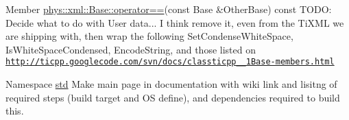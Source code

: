\label{dd/da0/todo__todo000032}
\hypertarget{dd/da0/todo__todo000032}{}
 
\begin{DoxyDescription}
\item[Member \hyperlink{classphys_1_1xml_1_1Base_af5412e64fd83a5193e28a20df462b9a6}{phys::xml::Base::operator==}(const Base \&OtherBase) const  ]TODO: Decide what to do with User data... I think remove it, even from the TiXML we are shipping with, then wrap the following SetCondenseWhiteSpace, IsWhiteSpaceCondensed, EncodeString, and those listed on \href{http://ticpp.googlecode.com/svn/docs/classticpp_1_1Base-members.html}{\tt http://ticpp.googlecode.com/svn/docs/classticpp\_\_\-1Base-\/members.html} 
\end{DoxyDescription}

\label{dd/da0/todo__todo000004}
\hypertarget{dd/da0/todo__todo000004}{}
 
\begin{DoxyDescription}
\item[Namespace \hyperlink{namespacestd}{std} ]Make main page in documentation with wiki link and lisitng of required steps (build target and OS define), and dependencies required to build this. 
\end{DoxyDescription}
